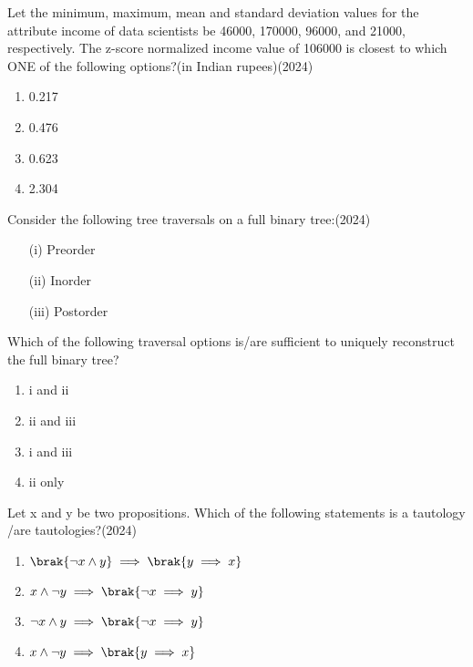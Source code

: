 
\iffalse
\chapter{2024}
\author{AI24BTECH11008}
\section{da}
\fi

    \item Let the minimum, maximum, mean and standard deviation values for the attribute
    income of data scientists be 46000, 170000, 96000, and 21000, respectively.
    The z-score normalized income value of 106000 is closest to which ONE of the
		following options?(in Indian rupees)\hfill (2024)
    \begin{enumerate}[label = (\Alph*)]
        \item 0.217
        \item 0.476
        \item 0.623
        \item 2.304
    \end{enumerate}
    \item Consider the following tree traversals on a full binary tree:\hfill (2024)
    \begin{itemize}
        \item[(i)] Preorder
        \item[(ii)] Inorder
        \item[(iii)] Postorder  
    \end{itemize}
    Which of the following traversal options is/are sufficient to uniquely reconstruct the full binary tree?
    \begin{enumerate}[label = (\Alph*)]
        \item i and ii
        \item ii and iii 
        \item i and iii 
        \item ii only 
    \end{enumerate} 
    \item Let x and y be two propositions. Which of the following statements is a tautology
    /are tautologies?\hfill (2024)
    \begin{enumerate}[label = (\Alph*)]
        \item $\brak{\neg x \land y}\implies \brak{y\implies x} $
        \item ${ x \land \neg y}\implies \brak{\neg x \implies y} $
        \item ${\neg x \land y}\implies \brak{\neg x \implies y} $
        \item ${ x \land\neg y}\implies \brak{y\implies x} $
    \end{enumerate}
